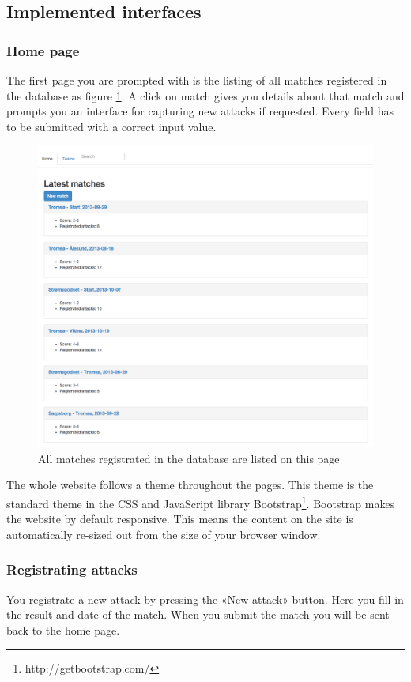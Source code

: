 \subsection{Implemented interfaces}

\subsubsection{Home page}
The first page you are prompted with is the listing of all matches registered in the database as figure \ref{fig:all_matches}. A click on match gives you details about that match and prompts you an interface for capturing new attacks if requested. Every field has to be submitted with a correct input value.

\begin{figure}[ht!]
\centering
\includegraphics[width=1\textwidth]{images/general/all_matches.png}
\caption{All matches registrated in the database are listed on this page}
\label{fig:all_matches}
\end{figure}

The whole website follows a theme throughout the pages. This theme is the standard theme in the CSS and JavaScript library Bootstrap\footnote{ http://getbootstrap.com/}. Bootstrap makes the website by default responsive. This means the content on the site is automatically re-sized out from the size of your browser window.

\subsubsection{Registrating attacks}
You registrate a new attack by pressing the «New attack» button. Here you fill in the result and date of the match. When you submit the match you will be sent back to the home page. 

